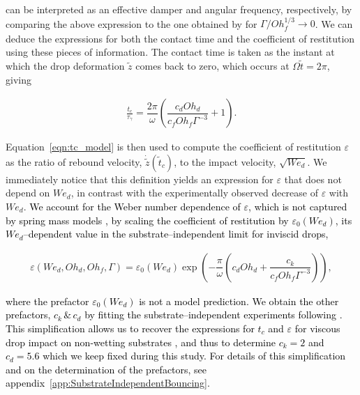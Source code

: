 \documentclass[]{jfm}
\newcommand{\revRev}[1]{\textcolor{black}{#1}}
\newcommand{\Ohd}{\mathit{Oh}_\mathit{d}}
\newcommand{\Ohf}{\mathit{Oh}_\mathit{f}}
\newcommand{\Wen}{\mathit{We}_\mathit{d}}
\begin{document}
	\noindent can be interpreted as an effective damper and angular frequency, respectively, by comparing the above expression to the one obtained by \citet{jha2020viscous} for $\Gamma/\Ohf^{1/3} \to 0$. We can deduce the expressions for both the contact time and the coefficient of restitution using these pieces of information. The contact time is taken as the instant at which the drop deformation $\tilde{z}$ comes back to zero, which occurs at $\Omega \tilde{t} = 2\pi$, giving
	
	\begin{align}
		\frac{t_{c}}{\tau_{\gamma}} =  \dfrac{2 \pi}{\omega} \left( \dfrac{c_{d} \Ohd}{c_{f} \Ohf\Gamma^{-3}} + 1 \right). \label{eqn:tc_model}
	\end{align}
	
	\noindent Equation~\eqref{eqn:tc_model} is then used to compute the coefficient of restitution $\varepsilon$ as the ratio of rebound velocity, $\dot{\tilde{z}}(\tilde{t}_c)$, to the impact velocity, $\sqrt{\Wen}$.
	We immediately notice that this definition yields an expression for $\varepsilon$ that does not depend on $\Wen$, in contrast with the experimentally observed decrease of $\varepsilon$ with $\Wen$.
	\revRev{We account for the Weber number dependence of $\varepsilon$, which is not captured by spring mass models \citep{jha2020viscous}, by scaling the coefficient of restitution by $\varepsilon_0(\Wen)$, its $\Wen$--dependent value in the substrate--independent limit for inviscid drops,}
	
	\begin{align}
		\varepsilon(\Wen, Oh_d, Oh_f, \Gamma)  = \varepsilon_0(\Wen) \exp\left( -\dfrac{\pi}{\omega} \left( c_{d} \Ohd + \dfrac{c_{k}}{c_{f} \Ohf \Gamma^{-3}} \right) \right),
		\label{eqn:eps_model}
	\end{align}
	
	\noindent \revRev{where the prefactor $\varepsilon_0(\Wen)$ is not a model prediction. We obtain the other prefactors, $c_k\,\&\,c_d$ by fitting the substrate--independent experiments following \citet{jha2020viscous}. 
		This simplification allows us to recover the expressions for $t_c$ and $\varepsilon$ for viscous drop impact on non-wetting substrates \citep{jha2020viscous}, and thus to determine $c_k = 2$ and $c_d = 5.6$ which we keep fixed during this study. For details of this simplification and on the determination of the prefactors, see appendix~\ref{app:SubstrateIndependentBouncing}.}
	
\end{document}

